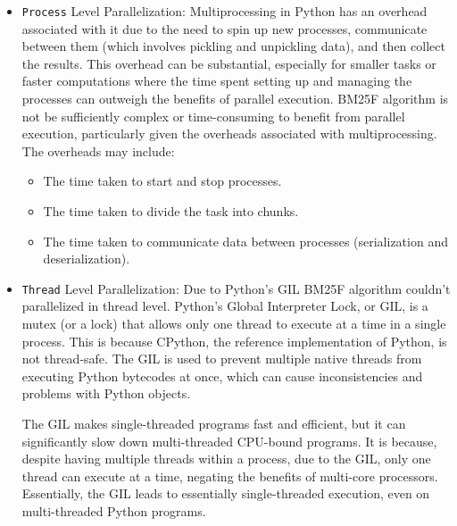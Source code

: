 \documentclass{article}
\begin{document}
\begin{itemize}
    \item {\texttt{Process} Level Parallelization}: Multiprocessing in Python has an overhead 
    associated with it due to the need to spin up new processes, communicate between them 
    (which involves pickling and unpickling data), and then collect the results. This overhead 
    can be substantial, especially for smaller tasks or faster computations where the time 
    spent setting up and managing the processes can outweigh the benefits of parallel execution.
    BM25F algorithm is not be sufficiently complex or time-consuming to benefit from parallel 
    execution, particularly given the overheads associated with multiprocessing. The overheads 
    may include:

    \begin{itemize}
        \item The time taken to start and stop processes.
        \item The time taken to divide the task into chunks.
        \item The time taken to communicate data between processes (serialization and deserialization).
    \end{itemize}

    \item {\texttt{Thread} Level Parallelization}: Due to Python's GIL BM25F algorithm couldn't 
    parallelized in thread level. Python's Global Interpreter Lock, or GIL, is a mutex (or a lock) 
    that allows only one thread to execute at a time in a single process. This is because CPython, 
    the reference implementation of Python, is not thread-safe. The GIL is used to prevent 
    multiple native threads from executing Python bytecodes at once, which can cause 
    inconsistencies and problems with Python objects.

    The GIL makes single-threaded programs fast and efficient, but it can significantly slow 
    down multi-threaded CPU-bound programs. It is because, despite having multiple threads 
    within a process, due to the GIL, only one thread can execute at a time, negating the 
    benefits of multi-core processors. Essentially, the GIL leads to essentially single-threaded 
    execution, even on multi-threaded Python programs.
\end{itemize}


\newpage
\appendix
\end{document}
